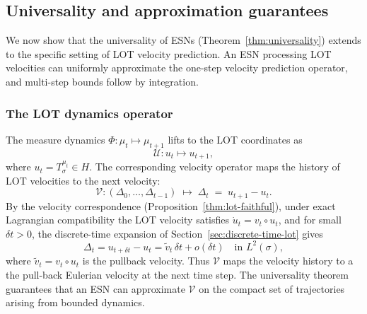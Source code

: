 \documentclass[11pt]{article}
\newcommand{\1}{\mathbf{1}}
\begin{document}
\subsection{Universality and approximation guarantees}\label{sec:rc-approx}

We now show that the universality of ESNs (Theorem~\ref{thm:universality}) extends to the specific setting of LOT velocity prediction. An ESN processing LOT velocities can uniformly approximate the one-step velocity prediction operator, and multi-step bounds follow by integration.

\subsubsection{The LOT dynamics operator}
\label{sec:lot-dynamics-op}

The measure dynamics $\Phi: \mu_t \mapsto \mu_{t+1}$ lifts to the LOT
coordinates as
\[
  \mathcal{U}: u_t \mapsto u_{t+1},
\]
where $u_t = T_\sigma^{\mu_t} \in H$. The corresponding velocity operator
maps the history of LOT velocities to the next velocity:
\begin{equation}\label{eq:velocity-operator}
  \mathcal{V}: (\Delta_0, \ldots, \Delta_{t-1}) \;\mapsto\; \Delta_t
  \;=\; u_{t+1} - u_t.
\end{equation}
By the velocity correspondence (Proposition~\ref{thm:lot-faithful}), under exact Lagrangian compatibility the LOT velocity satisfies
$\dot u_t = v_t \circ u_t$, and for small
$\delta t > 0$, the discrete-time expansion of
Section~\ref{sec:discrete-time-lot} gives
\begin{equation}\label{eq:lot-euler}
  \Delta_t = u_{t+\delta t} - u_t = \widetilde{v}_t \, \delta t + o(\delta t)
  \quad \text{in } L^2(\sigma),
\end{equation}
where $\widetilde{v}_t = v_t \circ u_t$ is the pullback velocity. Thus $\mathcal{V}$ maps the velocity history to a the pull-back Eulerian velocity at the next time step. The universality theorem guarantees that an ESN can approximate $\mathcal{V}$ on the compact set of trajectories arising from bounded dynamics. 
\end{document}
